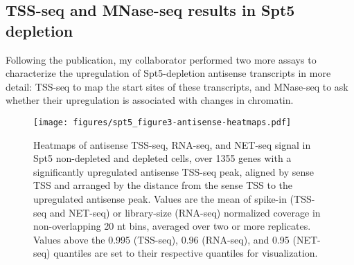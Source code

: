 \documentclass[9pt, letterpaper]{article}
\begin{document}

\subsection{TSS-seq and MNase-seq results in Spt5 depletion}

Following the publication, my collaborator performed two more assays to characterize the upregulation of Spt5-depletion antisense transcripts in more detail: TSS-seq to map the start sites of these transcripts, and MNase-seq to ask whether their upregulation is associated with changes in chromatin.

\begin{figure}[H]
\centering
\texttt{[image: figures/spt5\_figure3-antisense-heatmaps.pdf]}
\caption{Heatmaps of antisense TSS-seq, RNA-seq, and NET-seq signal in Spt5 non-depleted and depleted cells, over 1355 genes with a significantly upregulated antisense TSS-seq peak, aligned by sense TSS and arranged by the distance from the sense TSS to the upregulated antisense peak. Values are the mean of spike-in (TSS-seq and NET-seq) or library-size (RNA-seq) normalized coverage in non-overlapping 20 nt bins, averaged over two or more replicates. Values above the 0.995 (TSS-seq), 0.96 (RNA-seq), and 0.95 (NET-seq) quantiles are set to their respective quantiles for visualization.}
\label{fig:spt5_antisense-heatmaps}
\end{figure}
\end{document}

